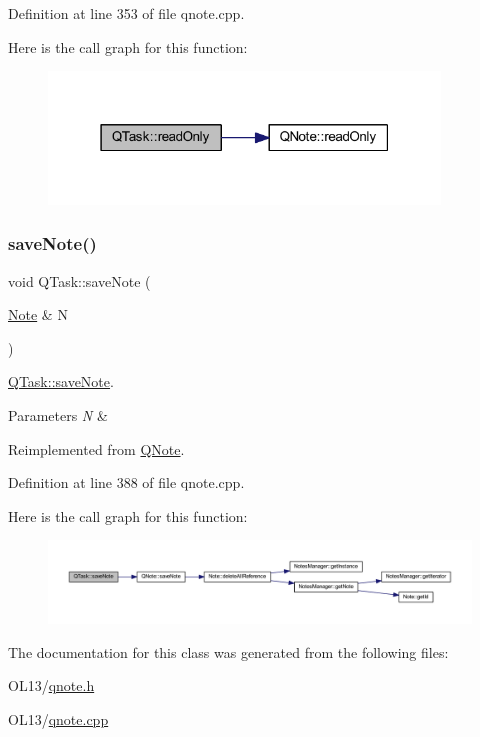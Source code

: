 Definition at line 353 of file qnote.\+cpp.

Here is the call graph for this function\+:\nopagebreak
\begin{figure}[H]
\begin{center}
\leavevmode
\includegraphics[width=295pt]{class_q_task_a1bf9080c14e7a94094bde3fa315d66d9_cgraph}
\end{center}
\end{figure}
\mbox{\label{class_q_task_ae304b097cdfd1169d2b190bbad3922eb}} 
\subsubsection{\texorpdfstring{save\+Note()}{saveNote()}}
{\footnotesize\ttfamily void Q\+Task\+::save\+Note (\begin{DoxyParamCaption}\item[{\hyperlink{class_note}{Note} \&}]{N }\end{DoxyParamCaption})\hspace{0.3cm}{\ttfamily [virtual]}}



\hyperlink{class_q_task_ae304b097cdfd1169d2b190bbad3922eb}{Q\+Task\+::save\+Note}. 


\begin{DoxyParams}{Parameters}
{\em N} & \\
\hline
\end{DoxyParams}


Reimplemented from \hyperlink{class_q_note_a577f684ef199a17dc468d706b1383581}{Q\+Note}.



Definition at line 388 of file qnote.\+cpp.

Here is the call graph for this function\+:\nopagebreak
\begin{figure}[H]
\begin{center}
\leavevmode
\includegraphics[width=350pt]{class_q_task_ae304b097cdfd1169d2b190bbad3922eb_cgraph}
\end{center}
\end{figure}


The documentation for this class was generated from the following files\+:\begin{DoxyCompactItemize}
\item 
O\+L13/\hyperlink{qnote_8h}{qnote.\+h}\item 
O\+L13/\hyperlink{qnote_8cpp}{qnote.\+cpp}\end{DoxyCompactItemize}
